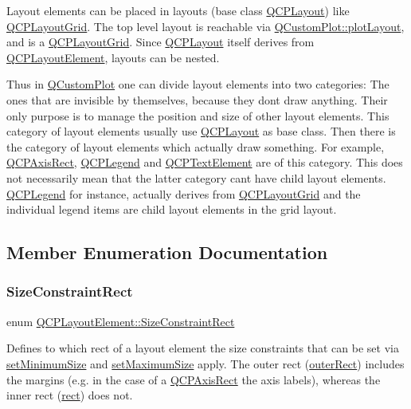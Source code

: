 Layout elements can be placed in layouts (base class \hyperlink{classQCPLayout}{Q\+C\+P\+Layout}) like \hyperlink{classQCPLayoutGrid}{Q\+C\+P\+Layout\+Grid}. The top level layout is reachable via \hyperlink{classQCustomPlot_af1a1f1f571237deb7c2bd34a5e9f018f}{Q\+Custom\+Plot\+::plot\+Layout}, and is a \hyperlink{classQCPLayoutGrid}{Q\+C\+P\+Layout\+Grid}. Since \hyperlink{classQCPLayout}{Q\+C\+P\+Layout} itself derives from \hyperlink{classQCPLayoutElement}{Q\+C\+P\+Layout\+Element}, layouts can be nested.

Thus in \hyperlink{classQCustomPlot}{Q\+Custom\+Plot} one can divide layout elements into two categories\+: The ones that are invisible by themselves, because they don\textquotesingle{}t draw anything. Their only purpose is to manage the position and size of other layout elements. This category of layout elements usually use \hyperlink{classQCPLayout}{Q\+C\+P\+Layout} as base class. Then there is the category of layout elements which actually draw something. For example, \hyperlink{classQCPAxisRect}{Q\+C\+P\+Axis\+Rect}, \hyperlink{classQCPLegend}{Q\+C\+P\+Legend} and \hyperlink{classQCPTextElement}{Q\+C\+P\+Text\+Element} are of this category. This does not necessarily mean that the latter category can\textquotesingle{}t have child layout elements. \hyperlink{classQCPLegend}{Q\+C\+P\+Legend} for instance, actually derives from \hyperlink{classQCPLayoutGrid}{Q\+C\+P\+Layout\+Grid} and the individual legend items are child layout elements in the grid layout. 

\subsection{Member Enumeration Documentation}
\mbox{\label{classQCPLayoutElement_a0afb3e5773529e4bd20e448f81be4d2a}} 
\subsubsection{\texorpdfstring{Size\+Constraint\+Rect}{SizeConstraintRect}}
{\footnotesize\ttfamily enum \hyperlink{classQCPLayoutElement_a0afb3e5773529e4bd20e448f81be4d2a}{Q\+C\+P\+Layout\+Element\+::\+Size\+Constraint\+Rect}}

Defines to which rect of a layout element the size constraints that can be set via \hyperlink{classQCPLayoutElement_a5dd29a3c8bc88440c97c06b67be7886b}{set\+Minimum\+Size} and \hyperlink{classQCPLayoutElement_a74eb5280a737ab44833d506db65efd95}{set\+Maximum\+Size} apply. The outer rect (\hyperlink{classQCPLayoutElement_a2a32a12a6161c9dffbadeb9cc585510c}{outer\+Rect}) includes the margins (e.\+g. in the case of a \hyperlink{classQCPAxisRect}{Q\+C\+P\+Axis\+Rect} the axis labels), whereas the inner rect (\hyperlink{classQCPLayoutElement_a208effccfe2cca4a0eaf9393e60f2dd4}{rect}) does not.

